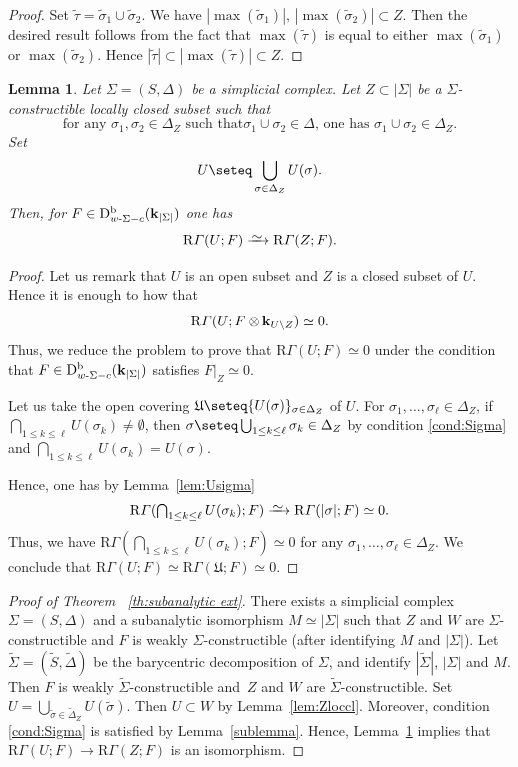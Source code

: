 \documentclass[JEP,XML,SOM,Unicode]{cedram}
\newcommand{\isom}{\xrightarrow{{\raisebox{-.6ex}[0ex][0ex]{$\mspace{1mu}\textstyle\sim\mspace{2mu}$}}}}
\let \tilde\oldtilde
\let\tilde\widetilde
\theoremstyle{plain}
\newtheorem{lemma}[theorem]{Lemma}
\theoremstyle{definition}
\newcommand{\derived}[1]{\mathrm{#1}}
\newcommand{\derd}{\derived{D}}
\newcommand{\derr}{\derived{R}}
\newcommand{\BDC}{\derd^{\mathrm{b}}}
\newcommand{\field}{\mathbf{k}}\let\cor\field
\newcommand{\rsect}{\derr\varGamma}
\newcommand{\tens}[1][]{\mathbin{\otimes_{\raise1.5ex\hbox to-.1em{}#1}}}
\begin{document}
\begin{proof}
Set $\tilde\tau=\tilde\sigma_1\cup\tilde\sigma_2$.
We have
$|\max(\tilde\sigma_1)|,\,|\max(\tilde\sigma_2)|\subset Z$.
Then the desired result follows from the fact that
$\max(\tilde\tau)$ is equal to either
$\max(\tilde\sigma_1)$ or $\max(\tilde\sigma_2)$.
Hence $|\tilde\tau|\subset|\max(\tilde\tau)|\subset Z$.
\end{proof}

\label{subsec:proof}
\begin{lemma}\label{lem:contr}
Let $\Sigma=(S,\Delta)$ be a simplicial complex.
Let $Z\subset|\Sigma|$ be a $\Sigma$\nobreakdash-constructible locally closed subset such that
\begin{equation}
\text{for any $\sigma_1,\sigma_2\in\Delta_Z$ such that
$\sigma_1\cup \sigma_2\in\Delta$, }
\text{one has $\sigma_1\cup\sigma_2\in\Delta_Z$.}
\label{cond:Sigma}
\end{equation}
Set
\[U\seteq\bigcup_{\sigma\in\Delta_Z}U(\sigma).\]
Then, for $F\in\BDC_{w\text-\Sigma-c}(\field_{|\Sigma|})$ one has
\[\rsect(U;F)\isom\rsect(Z;F).\]
\end{lemma}
\begin{proof}
Let us remark that $U$ is an open subset and $Z$ is a closed subset of $U$.
Hence it is enough to how that
\[\rsect(U;F\tens\field_{U\setminus Z})\simeq0.\]
Thus, we reduce the problem to prove that
$\rsect(U;F)\simeq0$ under the condition
that $F\in\BDC_{w\text-\Sigma-c}(\field_{|\Sigma|})$ satisfies $F\vert_Z\simeq0$.

Let us take the open covering
$\mathfrak{U}\seteq\{U(\sigma)\}_{\sigma\in\Delta_Z}$ of $U$.
For $\sigma_1,\ldots,\sigma_\ell\in\Delta_Z$,
if $\bigcap_{1\le k\le \ell}U(\sigma_k)\not=\emptyset$, then
$\sigma\seteq\bigcup_{1\le k\le \ell}\sigma_k\in\Delta_Z$
by condition \eqref{cond:Sigma} and
$\bigcap_{1\le k\le \ell}U(\sigma_k)=U(\sigma)$.

Hence, one has by Lemma~\ref{lem:Usigma}
\[\rsect(\textstyle\bigcap_{1\le k\le \ell}U(\sigma_k);F)
\isom\rsect(|\sigma|;F)\simeq0.\]
Thus, we have
$\rsect(\bigcap_{1\le k\le \ell}U(\sigma_k);F)\simeq0$ for any
$\sigma_1,\ldots,\sigma_\ell\in\Delta_Z$.
We conclude that $\rsect(U;F)\simeq\rsect(\mathfrak{U};F)\simeq0$.
\end{proof}

\begin{proof}[{Proof of {\rm Theorem ~\ref{th:subanalytic ext}}}]
There exists a simplicial complex $\Sigma=(S,\Delta)$
and a subanalytic isomorphism $M\simeq|\Sigma|$
such that
$Z$ and $W$ are $\Sigma$-constructible and
$F$ is weakly $\Sigma$-constructible (after identifying $M$ and $|\Sigma|$).
Let $\tilde\Sigma=(\tilde S,\tilde\Delta)$ be the barycentric decomposition of $\Sigma$,
and identify $|\tilde\Sigma|$, $|\Sigma|$ and $M$.
Then $F$ is weakly $\tilde\Sigma$-constructible and~$Z$ and $W$ are $\tilde\Sigma$-constructible.
Set $U=\bigcup_{\tilde\sigma\in\tilde\Delta_Z}U(\tilde\sigma)$.
Then $U\subset W$ by Lemma~\ref{lem:Zloccl}.
Moreover, condition \eqref{cond:Sigma} is satisfied by Lemma~\ref{sublemma}.
Hence, Lemma~\ref{lem:contr}
implies that
$\rsect(U;F)\to\rsect(Z;F)$ is an isomorphism.
\end{proof}

\backmatter


\end{document}
